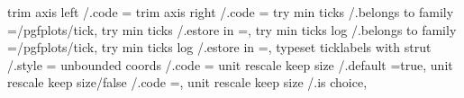 {{{{{{{{{{{{{{{{{{{{{{{{{{{{{{{{{{{{{{{{{{{{{{{{{{{{{{{{{{{{{{trim axis left                               /.code                                                                                    ={%
trim axis right                              /.code                                                                                    ={%
try min ticks                                /.belongs to family                                                                       =/pgfplots/tick,                                                                                                    
try min ticks                                /.estore in                                                                               =\axisdefaulttryminticks,                                                                                           
try min ticks log                            /.belongs to family                                                                       =/pgfplots/tick,                                                                                                    
try min ticks log                            /.estore in                                                                               =\pgfplots@default@try@minticks@log,                                                                                
typeset ticklabels with strut                /.style                                                                                   ={                                                                                                                  
unbounded coords                             /.code                                                                                    ={%
unit rescale keep size                       /.default                                                                                 =true,                                                                                                              
unit rescale keep size/false                 /.code                                                                                    ={\def\pgfplots@unit@vector@rescale@keep@size{0}},                                                                  
unit rescale keep size                       /.is choice,                                                                        
}}}}}}}}}}}}}}}}}}}}}}}}}}}}}}}}}}}}}}}}}}}}}}}}}}}}}}}}}}}}}}}}}}
